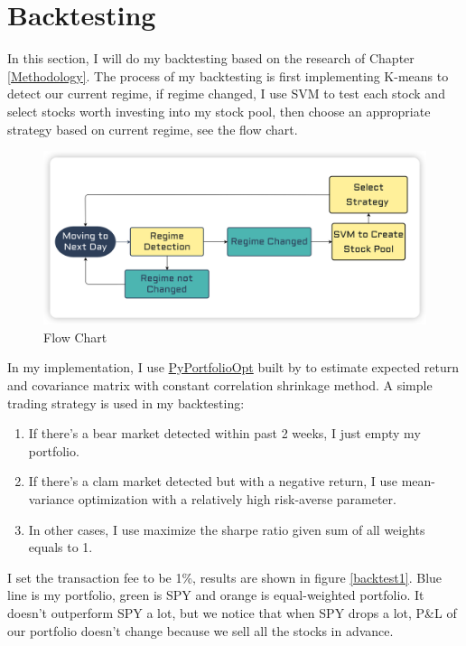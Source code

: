 \documentclass[a4paper,12pt]{article}
\begin{document}
\section{Backtesting}

In this section, I will do my backtesting based on the research of Chapter \ref{Methodology}. The process of my backtesting is first implementing K-means to detect our current regime, if regime changed, I use SVM to test each stock and select stocks worth investing into my stock pool, then choose an appropriate strategy based on current regime, see the flow chart.

\begin{figure}[H]
    \centering
    \includegraphics[scale=0.35]{invest.png}
    \caption{Flow Chart}\label{flow_chart}
\end{figure}

In my implementation, I use \href{https://pyportfolioopt.readthedocs.io/en/latest/}{PyPortfolioOpt} built by  \cite{Martin2021} to estimate expected return and covariance matrix with constant correlation shrinkage method. A simple trading strategy is used in my backtesting: 

\begin{enumerate}
    \item If there's a bear market detected within past 2 weeks, I just empty my portfolio.
    \item If there's a clam market detected but with a negative return, I use mean-variance optimization with a relatively high risk-averse parameter.
    \item In other cases, I use maximize the sharpe ratio given sum of all weights equals to 1.
  \end{enumerate}

I set the transaction fee to be 1\%, results are shown in figure \ref{backtest1}. Blue line is my portfolio, green is SPY and orange is equal-weighted portfolio. It doesn't outperform SPY a lot, but we notice that when SPY drops a lot, P\&L of our portfolio doesn't change because we sell all the stocks in advance.
\end{document}
